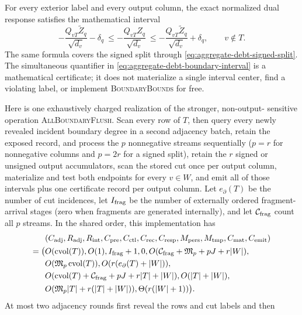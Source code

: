 \begin{theorem}
For every exterior label and every output column, the exact normalized dual
response satisfies the mathematical interval
\begin{equation}
 -\frac{Q_{vT}\widetilde Z_q}{\sqrt{d_v}}-\delta_q
 \ \leq
 -\frac{Q_{vT}Z_q}{\sqrt{d_v}}
 \ \leq
 -\frac{Q_{vT}\widetilde Z_q}{\sqrt{d_v}}+\delta_q,
 \qquad v\notin T.
 \label{eq:aggregate-debt-boundary-interval}
\end{equation}
The same formula covers the signed split through
\cref{eq:aggregate-debt-signed-split}.  The simultaneous quantifier in
\cref{eq:aggregate-debt-boundary-interval} is a mathematical certificate;
it does not materialize a single interval center, find a violating label, or
implement \textsc{BoundaryBounds} for free.

Here is one exhaustively charged realization of the stronger, non-output-
sensitive operation \textsc{AllBoundaryFlush}.  Scan every row of $T$, then
query every newly revealed incident boundary degree in a second adjacency
batch, retain the exposed record, and process the $p$ nonnegative streams sequentially
($p=r$ for nonnegative columns and $p=2r$ for a signed split), retain the $r$
signed or unsigned output accumulators, scan the stored cut once per output
column, materialize and test both endpoints for every $v\in W$, and emit all
of those intervals plus one certificate record per output column.  Let
$e_\partial(T)$ be the number of cut incidences, let $I_{\rm frag}$ be the
number of externally ordered fragment-arrival stages (zero when fragments
are generated internally), and let $\mathcal C_{\rm frag}$ count all $p$
streams.  In the shared order, this implementation has
\begin{equation}
 \begin{aligned}
 &(C_{\rm adj},R_{\rm adj},R_{\rm int},C_{\rm pre},C_{\rm ctl},C_{\rm rec},
 C_{\rm resp},M_{\rm pers},M_{\rm tmp},C_{\rm mat},C_{\rm emit})\\
 =\bigl(&O(\operatorname{cvol}(T)),O(1),I_{\rm frag}+1,0,
 O(\mathcal C_{\rm frag}+\mathfrak M_p+pJ+r|W|),\\
 &O(\mathfrak M_p\operatorname{cvol}(T)),
 O(r(e_\partial(T)+|W|)),\\
 &O(\operatorname{cvol}(T)+\mathcal C_{\rm frag}+pJ+r|T|+|W|),
 O(|T|+|W|),\\
 &O(\mathfrak M_p|T|+r(|T|+|W|)),
 \Theta(r(|W|+1))\bigr).
 \end{aligned}
 \label{eq:aggregate-debt-eleven-vector}
\end{equation}
At most two adjacency rounds first reveal the rows and cut labels and then

\end{theorem}
